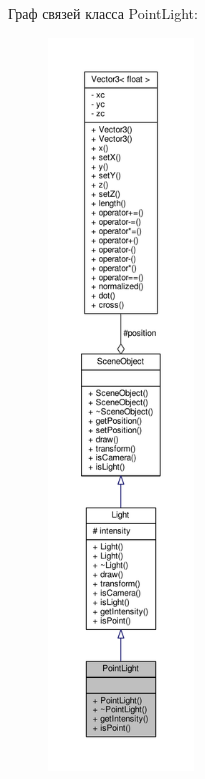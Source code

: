 Граф связей класса Point\+Light\+:
\nopagebreak
\begin{figure}[H]
\begin{center}
\leavevmode
\includegraphics[height=550pt]{d6/ddf/class_point_light__coll__graph}
\end{center}
\end{figure}
